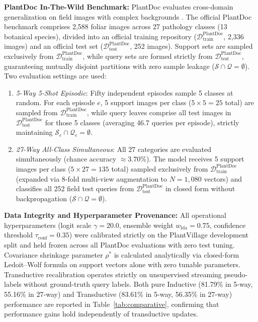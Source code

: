 \documentclass[conference]{IEEEtran}
\begin{document}
\textbf{PlantDoc In-The-Wild Benchmark:} PlantDoc evaluates cross-domain generalization on field images with complex backgrounds \cite{singh2020plantdoc}. The official PlantDoc benchmark comprises 2,588 foliar images across 27 pathology classes (13 botanical species), divided into an official training repository ($\mathcal{D}_{\text{train}}^{\text{PlantDoc}}$, 2,336 images) and an official test set ($\mathcal{D}_{\text{test}}^{\text{PlantDoc}}$, 252 images). Support sets are sampled exclusively from $\mathcal{D}_{\text{train}}^{\text{PlantDoc}}$, while query sets are formed strictly from $\mathcal{D}_{\text{test}}^{\text{PlantDoc}}$, guaranteeing mutually disjoint partitions with zero sample leakage ($\mathcal{S} \cap \mathcal{Q} = \emptyset$). Two evaluation settings are used:
\begin{enumerate}\setlength{\itemsep}{1pt plus 0.5pt}\setlength{\parsep}{0pt}
    \item \textit{5-Way 5-Shot Episodic}: Fifty independent episodes sample 5 classes at random. For each episode $e$, 5 support images per class ($5 \times 5 = 25$ total) are sampled from $\mathcal{D}_{\text{train}}^{\text{PlantDoc}}$, while query leaves comprise all test images in $\mathcal{D}_{\text{test}}^{\text{PlantDoc}}$ for those 5 classes (averaging 46.7 queries per episode), strictly maintaining $\mathcal{S}_e \cap \mathcal{Q}_e = \emptyset$.
    \item \textit{27-Way All-Class Simultaneous}: All 27 categories are evaluated simultaneously (chance accuracy $\approx 3.70\%$). The model receives 5 support images per class ($5 \times 27 = 135$ total) sampled exclusively from $\mathcal{D}_{\text{train}}^{\text{PlantDoc}}$ (expanded via 8-fold multi-view augmentation to $N = 1{,}080$ vectors) and classifies all 252 field test queries from $\mathcal{D}_{\text{test}}^{\text{PlantDoc}}$ in closed form without backpropagation ($\mathcal{S} \cap \mathcal{Q} = \emptyset$).
\end{enumerate}

\textbf{Data Integrity and Hyperparameter Provenance:} All operational hyperparameters (logit scale $\gamma=20.0$, ensemble weight $w_{\text{lda}}=0.75$, confidence threshold $\tau_{\text{conf}}=0.35$) were calibrated strictly on the PlantVillage development split and held frozen across all PlantDoc evaluations with zero test tuning. Covariance shrinkage parameter $\rho^*$ is calculated analytically via closed-form Ledoit--Wolf formula on support vectors alone with zero tunable parameters. Transductive recalibration operates strictly on unsupervised streaming pseudo-labels without ground-truth query labels. Both pure Inductive (81.79\% in 5-way, 55.16\% in 27-way) and Transductive (83.61\% in 5-way, 56.35\% in 27-way) performance are reported in Table~\ref{tab:comparative}, confirming that performance gains hold independently of transductive updates.
\end{document}
